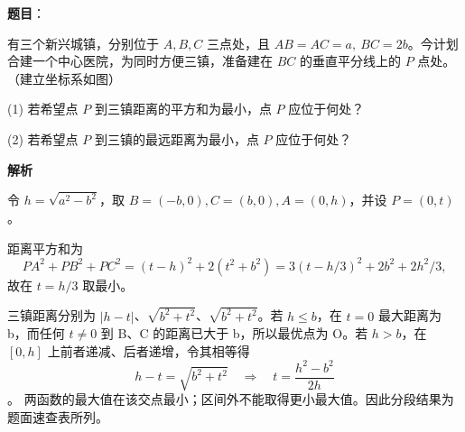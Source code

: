 \begin{answer}

\textbf{题目}：

有三个新兴城镇，分别位于 \(A,B,C\) 三点处，且 \(AB=AC=a,\ BC=2b\)。今计划合建一个中心医院，为同时方便三镇，准备建在 \(BC\) 的垂直平分线上的 \(P\) 点处。（建立坐标系如图）

    (1) 若希望点 \(P\) 到三镇距离的平方和为最小，点 \(P\) 应位于何处？

    (2) 若希望点 \(P\) 到三镇的最远距离为最小，点 \(P\) 应位于何处？
\nopagebreak[4]
\begin{center}\end{center}
\nopagebreak[4]
\textbf{解析}

令 \(h=\sqrt{a^2-b^2}\)，取 \(B=(-b,0),C=(b,0),A=(0,h)\)，并设 \(P=(0,t)\)。


距离平方和为
\nopagebreak[4]
\[
PA^2+PB^2+PC^2=(t-h)^2+2(t^2+b^2)=3(t-h/3)^2+2b^2+2h^2/3,
\]
故在 \(t=h/3\) 取最小。


三镇距离分别为 \(|h-t|\)、\(\sqrt{b^2+t^2}\)、\(\sqrt{b^2+t^2}\)。若 \(h\le b\)，在 \(t=0\) 最大距离为 b，而任何 \(t\ne0\) 到 B、C 的距离已大于 b，所以最优点为 O。若 \(h>b\)，在 \([0,h]\) 上前者递减、后者递增，令其相等得
\nopagebreak[4]
\[
h-t=\sqrt{b^2+t^2}\quad\Longrightarrow\quad t=\frac{h^2-b^2}{2h}
\]
。
两函数的最大值在该交点最小；区间外不能取得更小最大值。因此分段结果为题面速查表所列。



\end{answer}
